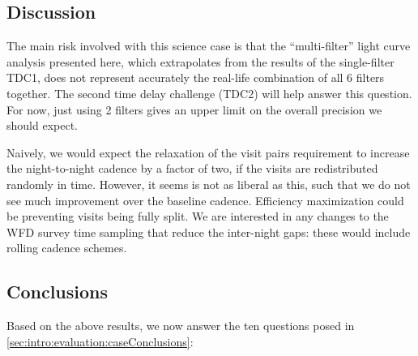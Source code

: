 



\subsection{Discussion}
\label{sec:\secname:discussion}

The main risk involved with this science case is that the
``multi-filter'' light curve analysis presented here, which extrapolates
from the results of the single-filter TDC1, does not represent
accurately the real-life combination of all 6 filters together. The
second time delay challenge (TDC2) will help answer this question.  For
now, just using 2 filters gives an upper limit on the overall precision
we should expect.

Naively, we would expect the relaxation of the visit pairs requirement
to increase the  night-to-night cadence by a factor of two, if the
visits are redistributed randomly in time. However, it seems \OpSim is
not as liberal as this, such that we do not see much improvement over
the baseline cadence. Efficiency maximization could be preventing visits
being fully split. We are interested in any changes to the WFD survey
time sampling that reduce the inter-night gaps: these  would include
rolling cadence schemes.



\subsection{Conclusions}

Based on the above results, we now answer the ten questions posed in
\autoref{sec:intro:evaluation:caseConclusions}:

